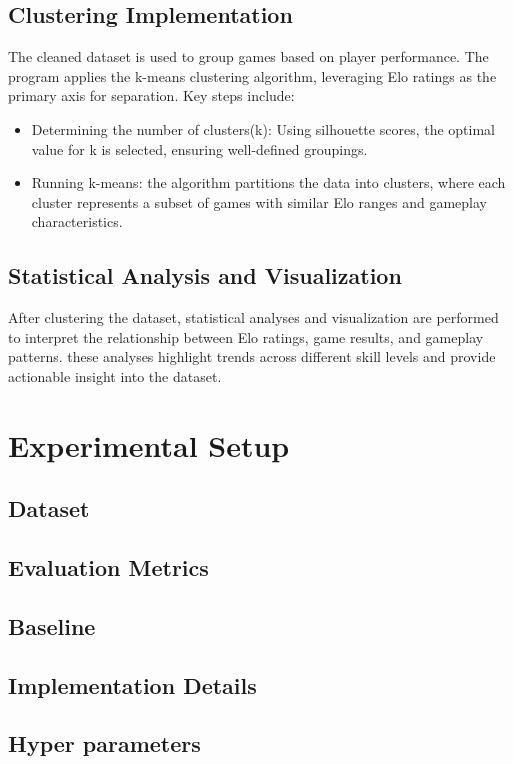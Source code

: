 \documentclass[conference]{IEEEtran}
\begin{document}
\subsection{Clustering Implementation}
 The cleaned dataset is used to group games based on player performance. The program applies the k-means clustering algorithm, leveraging Elo ratings as the primary axis for separation. Key steps include:
\begin{itemize}
    \item Determining the number of clusters(k): Using silhouette scores, the optimal value for k is selected, ensuring well-defined groupings.
    \item Running k-means: the algorithm partitions the data into clusters, where each cluster represents a subset of games with similar Elo ranges and gameplay characteristics.
\end{itemize}

\subsection{Statistical Analysis and Visualization}
After clustering the dataset, statistical analyses and visualization are performed to interpret the relationship between Elo ratings, game results, and gameplay patterns. these analyses highlight trends across different skill levels and provide actionable insight into the dataset.


\section{Experimental Setup}
\subsection{Dataset}

\subsection{Evaluation Metrics}

\subsection{Baseline}

\subsection{Implementation Details}

\subsection{Hyper parameters}
\end{document}
